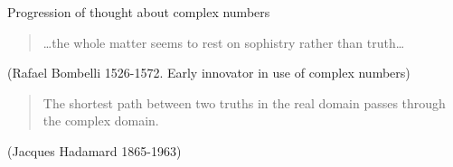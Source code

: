 \documentclass{beamer}
\begin{document}
\begin{frame}{Progression of thought about complex numbers}

\begin{quote}
\dots the whole matter seems to rest on sophistry rather than truth\dots
\end{quote}
(Rafael Bombelli 1526-1572. Early innovator in use of complex numbers)
\vfill
\begin{quote}
The shortest path between two truths in the real domain passes through the complex domain.
\end{quote}
(Jacques Hadamard 1865-1963)


\end{frame}



\end{document}
